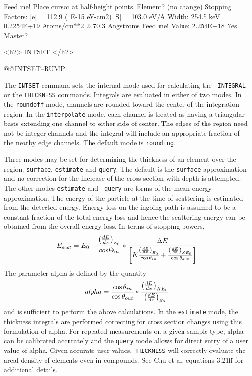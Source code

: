 {{{{{\medskip\beginscreen
Feed me! 
Place cursor at half-height points.
Element? (no change) 
 Stopping Factors:   [e] = 112.9 (1E-15 eV-cm2)  [S] = 103.0 eV/A
 Width:  254.5 keV    0.2254E+19 Atoms/cm**2     2470.3 Angstroms
Feed me! 
Value:   2.254E+18
Yes Master? 
\endscreen

<h2> INTSET </h2>


@@{INTSET--RUMP}

The {\tt INTSET} command sets the internal mode used for calculating the {\tt
INTEGRAL} or the {\tt THICKNESS} commands.  Integrals are evaluated in either
of two modes.  In the {\tt roundoff} mode, channels are rounded toward the
center of the integration region.  In the {\tt interpolate} mode, each channel
is treated as having a triangular basis extending one channel to either side
of center.   The edges of the region need not be integer channels and the
integral will include an appropriate fraction of the nearby edge channels. 
The default mode is {\tt rounding}.

Three modes may be set for determining the thickness of an element over the 
region, {\tt surface}, {\tt estimate} and {\tt query}.  The default is the
{\tt surface} approximation and no correction for the increase of the cross
section with depth is attempted.  The other modes {\tt estimate} and {\tt
query} are forms of the mean energy approximation.  The energy of the particle
at the time of scattering is estimated from the detected energy.  Energy loss
on the ingoing path is assumed to be a constant fraction of the total energy
loss and hence the scattering energy can be obtained from the overall energy
loss.  In terms of stopping powers, 
$$
E_{scat} = E_0-{\left ( {{dE}\over{dx}} \right )_{E_0} \over {cos \Theta_{in}}} *
          {{\Delta E} \over 
{\left [ K {\left ( {{dE}\over{dx}} \right )_{E_0} \over {\cos\theta_{in}}} +
           {\left ( {{dE}\over{dx}} \right )_{KE_0} \over {\cos\theta_{out}}} \right ]}}
$$
The parameter alpha is defined by the quantity
$$
 alpha = {{\cos\theta_{in}} \over {\cos\theta_{out}}} * 
           {{\left ( {{dE}\over{dx}} \right)_{KE_0}} \over 
           {\left ( {{dE}\over{dx}} \right)_{E_0}}}
$$
and is sufficient to perform the above calculations.  In the {\tt estimate}
mode, the thickness integrals are performed correcting for cross section
changes using this formulation of alpha.   For repeated measurements on a
given sample type, alpha can be calibrated accurately and the {\tt query}
mode allows for direct entry of a user value of alpha.  Given accurate user
values, {\tt THICKNESS} will correctly evaluate the areal density of elements
even in compounds.  See Chu et al. equations 3.21ff for additional details.

}}}}}
